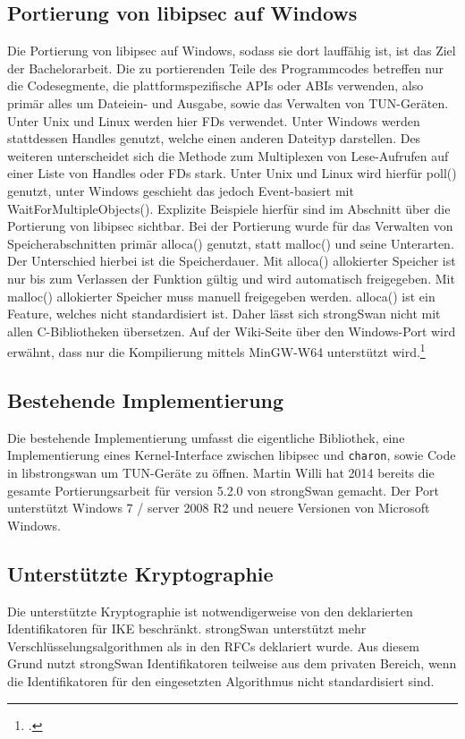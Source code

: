 \subsection{Portierung von libipsec auf Windows}
Die Portierung von libipsec auf Windows, sodass sie dort lauffähig ist, ist das Ziel
der Bachelorarbeit. Die zu portierenden Teile des Programmcodes betreffen nur
die Codesegmente, die plattformspezifische \acp{API} oder \acp{ABI} verwenden,
also primär alles um Dateiein- und Ausgabe, sowie das Verwalten von TUN-Geräten.
Unter Unix und Linux werden hier \acp{FD} verwendet. Unter Windows werden stattdessen
Handles genutzt, welche einen anderen Dateityp darstellen. Des weiteren unterscheidet
sich die Methode zum Multiplexen von Lese-Aufrufen auf einer Liste von Handles oder \acp{FD} stark.
Unter Unix und Linux wird hierfür poll() genutzt, unter Windows geschieht das jedoch
Event-basiert mit WaitForMultipleObjects().
Explizite Beispiele hierfür sind im Abschnitt über die Portierung von libipsec sichtbar.
Bei der Portierung wurde für das Verwalten von Speicherabschnitten 
primär alloca() genutzt, statt malloc() und seine Unterarten. Der Unterschied hierbei ist die
Speicherdauer. Mit alloca() allokierter Speicher ist nur bis zum Verlassen der Funktion gültig
und wird automatisch freigegeben. Mit malloc() allokierter Speicher muss manuell freigegeben werden.
alloca() ist ein Feature, welches nicht standardisiert ist.
Daher lässt sich strongSwan nicht mit allen C-Bibliotheken übersetzen.
Auf der Wiki-Seite über den Windows-Port wird erwähnt, dass nur die Kompilierung
mittels MinGW-W64 unterstützt wird.\footcite[][]{_windows_2015}


\subsection{Bestehende Implementierung}
Die bestehende Implementierung umfasst die eigentliche Bibliothek, eine Implementierung
eines Kernel-Interface zwischen libipsec und \texttt{charon}, sowie Code in libstrongswan
um TUN-Geräte zu öffnen. Martin Willi hat 2014 bereits die gesamte Portierungsarbeit
für version 5.2.0 von strongSwan gemacht. Der Port unterstützt Windows 7 / server 2008 R2
und neuere Versionen von Microsoft Windows.

\subsection{Unterstützte Kryptographie}
Die unterstützte Kryptographie ist notwendigerweise von den deklarierten Identifikatoren
für IKE beschränkt. strongSwan unterstützt mehr Verschlüsselungsalgorithmen als
in den \acp{RFC} deklariert wurde. Aus diesem Grund nutzt strongSwan Identifikatoren
teilweise aus dem privaten Bereich, wenn die Identifikatoren für den eingesetzten Algorithmus
nicht standardisiert sind.

